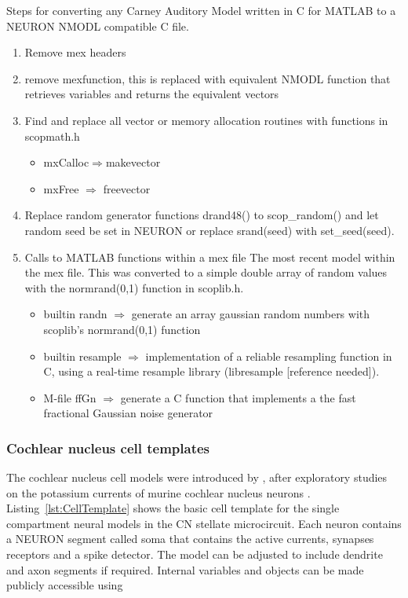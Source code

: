 Steps for converting any Carney Auditory Model written in C for MATLAB to a
NEURON NMODL compatible C file.
\begin{enumerate}
\item Remove mex headers
\item remove \textsf{mexfunction}, this is replaced with equivalent NMODL
  function that retrieves variables and returns the equivalent vectors
\item Find and replace all vector or memory allocation routines with functions
  in scopmath.h
  \begin{itemize}
  \item \textsf{mxCalloc}$\Rightarrow$\textsf{makevector}
  \item \textsf{mxFree} $\Rightarrow$ \textsf{freevector}
  \end{itemize}
\item Replace random generator functions \textsf{drand48()} to
  \mbox{\textsf{scop\_random()}} and let random seed be set in NEURON or replace
  \textsf{srand(seed)} with \mbox{\textsf{set\_seed(seed)}}.
\item Calls to MATLAB functions within a mex file The most recent model within
  the mex file.  This was converted to a simple double array of random values
  with the \mbox{\textsf{normrand(0,1)}} function in \mbox{\textsf{scoplib.h}}.
  \begin{itemize}
  \item builtin \textsf{randn} $\Rightarrow$ generate an array gaussian random
    numbers with scoplib's \mbox{\textsf{normrand(0,1)}} function
  \item builtin \textsf{resample} $\Rightarrow$ implementation of a reliable
    resampling function in C, using a real-time resample library (libresample
    [reference needed]).
  \item M-file \textsf{ffGn} $\Rightarrow$ generate a C function that implements
    a the fast fractional Gaussian noise generator
  \end{itemize}

\end{enumerate}

\subsubsection[CN cells]{Cochlear nucleus cell
  templates}\label{sec:APDX:Cell_templates}

The cochlear nucleus cell models were introduced by \citet{RothmanManis:2003b},
after exploratory studies on the potassium currents of murine cochlear nucleus
neurons \citep{RothmanManis:2003,RothmanManis:2003a}.
Listing~\ref{lst:CellTemplate} shows the basic cell template for the
single compartment neural models in the CN stellate microcircuit.  Each neuron
contains a NEURON segment called soma that contains the active currents,
synapses receptors and a spike detector. The model can be adjusted to include
dendrite and axon segments if required. Internal variables and objects can be
made publicly accessible using

